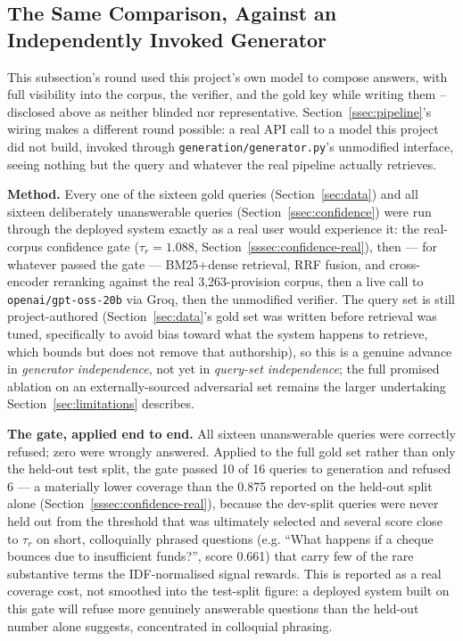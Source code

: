 \documentclass[conference]{IEEEtran}
\begin{document}
\subsection{The Same Comparison, Against an Independently Invoked Generator}
\label{ssec:live-generation}

This subsection's round used this project's own model to compose answers,
with full visibility into the corpus, the verifier, and the gold key while
writing them -- disclosed above as neither blinded nor representative.
Section~\ref{ssec:pipeline}'s wiring makes a different round possible: a real
API call to a model this project did not build, invoked through
\texttt{generation/generator.py}'s unmodified interface, seeing nothing but
the query and whatever the real pipeline actually retrieves.

\textbf{Method.} Every one of the sixteen gold queries (Section~\ref{sec:data})
and all sixteen deliberately unanswerable queries
(Section~\ref{ssec:confidence}) were run through the deployed system exactly
as a real user would experience it: the real-corpus confidence gate
($\tau_r=1.088$, Section~\ref{sssec:confidence-real}), then --- for whatever
passed the gate --- BM25+dense retrieval, RRF fusion, and cross-encoder
reranking against the real 3{,}263-provision corpus, then a live call to
\texttt{openai/gpt-oss-20b} via Groq, then the unmodified verifier. The query
set is still project-authored (Section~\ref{sec:data}'s gold set was written
before retrieval was tuned, specifically to avoid bias toward what the system
happens to retrieve, which bounds but does not remove that authorship), so
this is a genuine advance in \emph{generator independence}, not yet in
\emph{query-set independence}; the full promised ablation on an
externally-sourced adversarial set remains the larger undertaking
Section~\ref{sec:limitations} describes.

\textbf{The gate, applied end to end.} All sixteen unanswerable queries were
correctly refused; zero were wrongly answered. Applied to the full gold set
rather than only the held-out test split, the gate passed 10 of 16 queries to
generation and refused 6 --- a materially lower coverage than the 0.875
reported on the held-out split alone (Section~\ref{sssec:confidence-real}),
because the dev-split queries were never held out from the threshold that was
ultimately selected and several score close to $\tau_r$ on short, colloquially
phrased questions (e.g. ``What happens if a cheque bounces due to
insufficient funds?'', score 0.661) that carry few of the rare substantive
terms the IDF-normalised signal rewards. This is reported as a real coverage
cost, not smoothed into the test-split figure: a deployed system built on
this gate will refuse more genuinely answerable questions than the held-out
number alone suggests, concentrated in colloquial phrasing.
\end{document}
